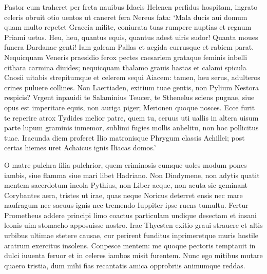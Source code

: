 \documentclass{book}
\newenvironment {carmen} [1] [\relax] 
  {\Titulus \Versus \incipit*\numerus{1}#1}
  {\endVersus}
\newcommand {\Alcaic}    {\Forma \strophae {0 \poena 01 \poena 2}}
\newcommand {\AsclA}     {\Forma \strophae {0 \poena 00 \poena 2}}
\begin{document}
\begin{carmen}[\AsclA]

 Pastor cum traheret per freta nauibus
 Idaeis Helenen perfidus hospitam,
 ingrato celeris obruit otio
      uentos ut caneret fera
 Nereus fata: `Mala ducis aui domum               
 quam multo repetet Graecia milite,
 coniurata tuas rumpere nuptias
      et regnum Priami uetus.
 Heu, heu, quantus equis, quantus adest uiris
 sudor! Quanta moues funera Dardanae               
 genti! Iam galeam Pallas et aegida
      currusque et rabiem parat.
 Nequicquam Veneris praesidio ferox
 pectes caesariem grataque feminis
 inbelli cithara carmina diuides;               
      nequicquam thalamo grauis
 hastas et calami spicula Cnosii
 uitabis strepitumque et celerem sequi
 Aiacem: tamen, heu serus, adulteros
       crines puluere collines.
 Non Laertiaden, exitium tuae               
 gentis, non Pylium Nestora respicis?
 Vrgent inpauidi te Salaminius
      Teucer, te Sthenelus sciens
 pugnae, siue opus est imperitare equis,               
 non auriga piger; Merionen quoque
 nosces. Ecce furit te reperire atrox
      Tydides melior patre,
 quem tu, ceruus uti uallis in altera
 uisum parte lupum graminis inmemor,               
 sublimi fugies mollis anhelitu,
      non hoc pollicitus tuae.
 Iracunda diem proferet Ilio
 matronisque Phrygum classis Achillei;
 post certas hiemes uret Achaicus               
      ignis Iliacas domos.' 

\end{carmen}
\begin{carmen}[\Alcaic]
O matre pulchra filia pulchrior,
 quem criminosis cumque uoles modum
      pones iambis, siue flamma
      siue mari libet Hadriano.
 Non Dindymene, non adytis quatit               
 mentem sacerdotum incola Pythius,
      non Liber aeque, non acuta
      sic geminant Corybantes aera,
 tristes ut irae, quas neque Noricus
 deterret ensis nec mare naufragum               
      nec saeuus ignis nec tremendo
      Iuppiter ipse ruens tumultu.
 Fertur Prometheus addere principi
 limo coactus particulam undique
       desectam et insani leonis
      uim stomacho apposuisse nostro.               
 Irae Thyesten exitio graui
 strauere et altis urbibus ultimae
      stetere causae, cur perirent
       funditus inprimeretque muris               
 hostile aratrum exercitus insolens.
 Conpesce mentem: me quoque pectoris
      temptauit in dulci iuuenta
      feruor et in celeres iambos
 misit furentem. Nunc ego mitibus               
 mutare quaero tristia, dum mihi
      fias recantatis amica
      opprobriis animumque reddas. 

\end{carmen}
\end{document}
